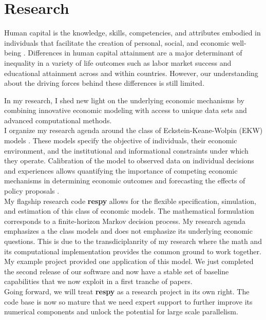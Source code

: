 \section{Research}\label{Research}
Human capital is the knowledge, skills, competencies, and attributes embodied in individuals that facilitate the creation of personal, social, and economic well-being \citep{OECD.2001}. Differences in human capital attainment are a major determinant of inequality in a variety of life outcomes such as labor market success and educational attainment across and within countries. However, our understanding about the driving forces behind these differences is still limited.

\noindent In my research, I shed new light on the underlying economic mechanisms by combining innovative economic modeling with access to unique data sets and advanced computational methods.\\

\noindent I organize my research agenda around the class of Eckstein-Keane-Wolpin (EKW) models \citep{Adda.2017, Blundell.2016, Keane.1997}. These models specify the objective of individuals, their economic environment, and the institutional and informational constraints under which they operate. Calibration of the model to observed data on individual decisions and experiences allows quantifying the importance of competing economic mechanisms in determining economic outcomes and forecasting the effects of policy proposals \citep{Wolpin.2013}.\\

\noindent My flagship research code \textbf{respy} allows for the flexible specification, simulation, and estimation of this class of economic models. The mathematical formulation corresponds to a finite-horizon Markov decision process. My research agenda emphasizes a the class models and does not emphasize its underlying economic questions. This is due to the transdiciplanrity of my research where the math and its computational implementation provides the common ground to work together. My example project provided one application of this model. We just completed the second release of our software and now have a stable set of baseline capabilities that we now exploit in a first tranche of papers.\\

\noindent Going forward, we will treat \textbf{respy} as a research project in its own right. The code base is now so mature that we need expert support to further improve its numerical components and unlock the potential for large scale parallelism.

